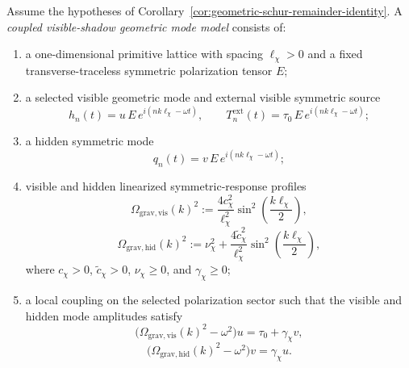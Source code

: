 \begin{definition}
\label{def:coupled-visible-shadow-geometric-mode-model}
Assume the hypotheses of
Corollary~\ref{cor:geometric-schur-remainder-identity}. A
\emph{coupled visible-shadow geometric mode model} consists of:
\begin{enumerate}[label=(\roman*),itemsep=0.2em]
\item a one-dimensional primitive lattice with spacing \(\ell_{\chi}>0\)
      and a fixed transverse-traceless symmetric polarization tensor
      \(E\);
\item a selected visible geometric mode and external visible symmetric source
      \[
      h_n(t)=u\,E\,e^{i(nk\ell_{\chi}-\omega t)},
      \qquad
      T_n^{\mathrm{ext}}(t)=\tau_0\,E\,e^{i(nk\ell_{\chi}-\omega t)};
      \]
\item a hidden symmetric mode
      \[
      q_n(t)=v\,E\,e^{i(nk\ell_{\chi}-\omega t)};
      \]
\item visible and hidden linearized symmetric-response profiles
      \[
      \Omega_{\mathrm{grav,vis}}(k)^2
      :=
      \frac{4c_{\chi}^2}{\ell_{\chi}^2}
      \sin^2\!\left(\frac{k\ell_{\chi}}{2}\right),
      \]
      \[
      \Omega_{\mathrm{grav,hid}}(k)^2
      :=
      \nu_{\chi}^2
      +
      \frac{4\widetilde c_{\chi}^2}{\ell_{\chi}^2}
      \sin^2\!\left(\frac{k\ell_{\chi}}{2}\right),
      \]
      where \(c_{\chi}>0\), \(\widetilde c_{\chi}>0\), \(\nu_{\chi}\ge 0\),
      and \(\gamma_{\chi}\ge 0\);
\item a local coupling on the selected polarization sector such that the
      visible and hidden mode amplitudes satisfy
      \[
      \bigl(\Omega_{\mathrm{grav,vis}}(k)^2-\omega^2\bigr)u
      =
      \tau_0+\gamma_{\chi}v,
      \]
      \[
      \bigl(\Omega_{\mathrm{grav,hid}}(k)^2-\omega^2\bigr)v
      =
      \gamma_{\chi}u.
      \]
\end{enumerate}
\end{definition}

